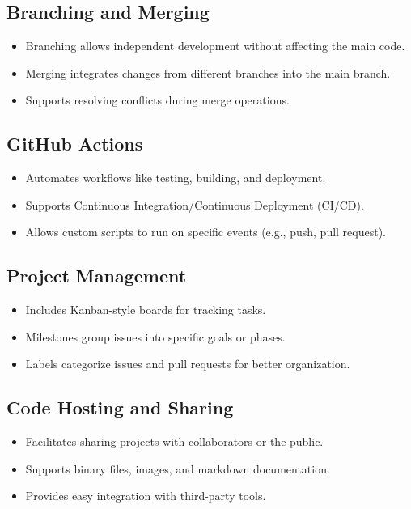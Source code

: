 \documentclass[openany]{book} %
\begin{document}
\subsection{Branching and Merging}
\begin{itemize}
    \item Branching allows independent development without affecting the main code.
    \item Merging integrates changes from different branches into the main branch.
    \item Supports resolving conflicts during merge operations.
\end{itemize}

\subsection{GitHub Actions}
\begin{itemize}
    \item Automates workflows like testing, building, and deployment.
    \item Supports Continuous Integration/Continuous Deployment (CI/CD).
    \item Allows custom scripts to run on specific events (e.g., push, pull request).
\end{itemize}

\subsection{Project Management}
\begin{itemize}
    \item Includes Kanban-style boards for tracking tasks.
    \item Milestones group issues into specific goals or phases.
    \item Labels categorize issues and pull requests for better organization.
\end{itemize}

\subsection{Code Hosting and Sharing}
\begin{itemize}
    \item Facilitates sharing projects with collaborators or the public.
    \item Supports binary files, images, and markdown documentation.
    \item Provides easy integration with third-party tools.
\end{itemize}
\end{document}
